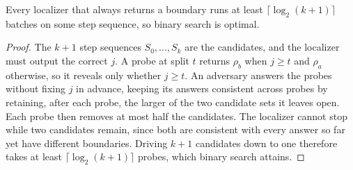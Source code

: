 \begin{theorem}
\label{thm:lb-bsearch}
Every localizer that always returns a boundary runs at least $\lceil\log_2(k+1)\rceil$ batches on
some step sequence, so binary search is optimal.
\end{theorem}
\begin{proof}
The $k+1$ step sequences $S_0,\dots,S_k$ are the candidates, and the localizer must output the
correct $j$. A probe at split $t$ returns $\rho_b$ when $j\ge t$ and $\rho_a$ otherwise, so it
reveals only whether $j\ge t$. An adversary answers the probes without fixing $j$ in advance,
keeping its answers consistent across probes by retaining, after each probe, the larger of the two
candidate sets it leaves open. Each probe then removes at most half the candidates. The localizer
cannot stop while two candidates remain, since both are consistent with every answer so far yet
have different boundaries. Driving $k+1$ candidates down to one therefore takes at least
$\lceil\log_2(k+1)\rceil$ probes, which binary search attains.
\end{proof}
